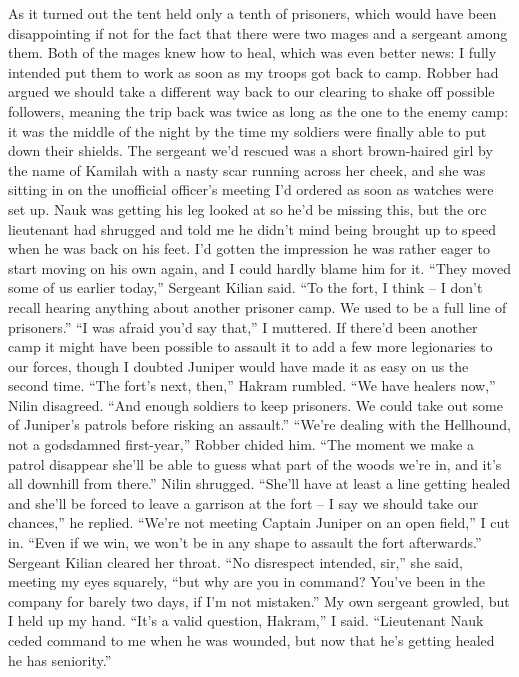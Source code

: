 \documentclass[12pt, openany]{book}
\begin{document}
As it turned out the tent held only a tenth of prisoners, which would have been disappointing if not for the fact that there were two mages and a sergeant among them. Both of the mages knew how to heal, which was even better news: I fully intended put them to work as soon as my troops got back to camp. Robber had argued we should take a different way back to our clearing to shake off possible followers, meaning the trip back was twice as long as the one to the enemy camp: it was the middle of the night by the time my soldiers were finally able to put down their shields. The sergeant we’d rescued was a short brown-haired girl by the name of Kamilah with a nasty scar running across her cheek, and she was sitting in on the unofficial officer’s meeting I’d ordered as soon as watches were set up. Nauk was getting his leg looked at so he’d be missing this, but the orc lieutenant had shrugged and told me he didn’t mind being brought up to speed when he was back on his feet. I’d gotten the impression he was rather eager to start moving on his own again, and I could hardly blame him for it.
“They moved some of us earlier today,” Sergeant Kilian said. “To the fort, I think – I don’t recall hearing anything about another prisoner camp. We used to be a full line of prisoners.”
“I was afraid you’d say that,” I muttered.
If there’d been another camp it might have been possible to assault it to add a few more legionaries to our forces, though I doubted Juniper would have made it as easy on us the second time.
“The fort’s next, then,” Hakram rumbled.
“We have healers now,” Nilin disagreed. “And enough soldiers to keep prisoners. We could take out some of Juniper’s patrols before risking an assault.”
“We’re dealing with the Hellhound, not a godsdamned first-year,” Robber chided him. “The moment we make a patrol disappear she’ll be able to guess what part of the woods we’re in, and it’s all downhill from there.”
Nilin shrugged.
“She’ll have at least a line getting healed and she’ll be forced to leave a garrison at the fort – I say we should take our chances,” he replied.
“We’re not meeting Captain Juniper on an open field,” I cut in. “Even if we win, we won’t be in any shape to assault the fort afterwards.”
Sergeant Kilian cleared her throat.
“No disrespect intended, sir,” she said, meeting my eyes squarely, “but why are you in command? You’ve been in the company for barely two days, if I’m not mistaken.”
My own sergeant growled, but I held up my hand.
“It’s a valid question, Hakram,” I said. “Lieutenant Nauk ceded command to me when he was wounded, but now that he’s getting healed he has seniority.”
\end{document}
